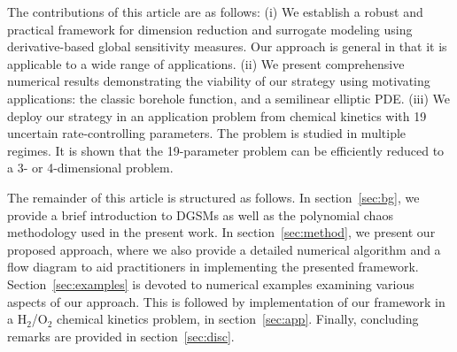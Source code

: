 
The contributions of this article are as follows: (i) We establish a robust and
practical framework for dimension reduction and surrogate modeling using
derivative-based global sensitivity measures. Our
approach is general in that it is applicable to a wide range of applications.
(ii) We present comprehensive numerical results demonstrating the viability of
our strategy using motivating applications: the classic borehole
function, and a semilinear elliptic PDE.  (iii) We 
deploy our strategy in an application problem from chemical kinetics with 19
uncertain rate-controlling parameters. The problem is studied in multiple regimes.
It is shown that the 19-parameter problem can be efficiently reduced to a 3- 
or 4-dimensional problem. 

The remainder of this article is structured as follows. 
In section~\ref{sec:bg}, we provide a
brief introduction to DGSMs as well as the polynomial chaos methodology used in
the present work.  In section~\ref{sec:method}, we present our proposed
approach, where we also provide a detailed numerical algorithm and a flow
diagram to aid practitioners in implementing the presented framework.
Section~\ref{sec:examples} is devoted to numerical examples
examining various aspects of our approach. This is followed by implementation
of our framework in a H$_2$/O$_2$ chemical kinetics problem, in section~\ref{sec:app}.
Finally, concluding remarks are provided in section~\ref{sec:disc}.






